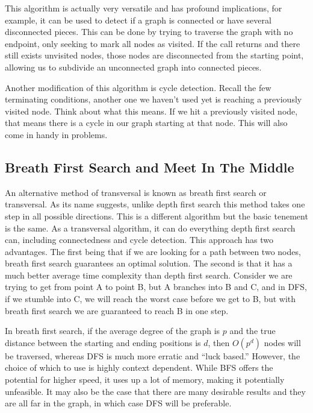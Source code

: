 \documentclass[12 pt, twoside] {article}
\begin{document}
{This algorithm is actually very versatile and has profound implications, for
example, it can be used to detect if a graph is connected or have several
disconnected pieces. This can be done by trying to traverse the graph with no
endpoint, only seeking to mark all nodes as visited. If the call returns and
there still exists unvisited nodes, those nodes are disconnected from the
starting point, allowing us to subdivide an unconnected graph into connected
pieces.

Another modification of this algorithm is cycle detection. Recall the few
terminating conditions, another one we haven't used yet is reaching a previously
visited node. Think about what this means. If we hit a previously visited node,
that means there is a cycle in our graph starting at that node. This will also
come in handy in problems.

\subsection*{Breath First Search and Meet In The Middle}

An alternative method of transversal is known as breath first search or
transversal. As its name suggests, unlike depth first search this method takes
one step in all possible directions. This is a different algorithm but the basic
tenement is the same. As a transversal algorithm, it can do everything depth
first search can, including connectedness and cycle detection. This approach has
two advantages. The first being that if we are looking for a path between two
nodes, breath first search guarantees an optimal solution. The second is that it
has a much better average time complexity than depth first search. Consider we
are trying to get from point A to point B, but A branches into B and C, and in
DFS, if we stumble into C, we will reach the worst case before we get to B, but
with breath first search we are guaranteed to reach B in one step.

In breath first search, if the average degree of the graph is $p$ and the true
distance between the starting and ending positions is $d$, then $O(p^d)$ nodes
will be traversed, whereas DFS is much more erratic and ``luck based.'' However,
the choice of which to use is highly context dependent. While BFS offers the
potential for higher speed, it uses up a lot of memory, making it potentially
unfeasible. It may also be the case that there are many desirable results and
they are all far in the graph, in which case DFS will be preferable. 

}
\end{document}
